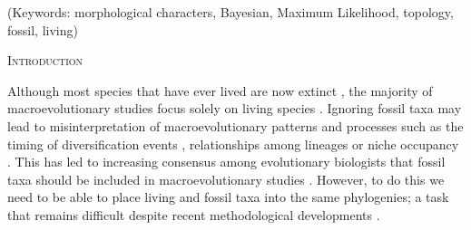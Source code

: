 \documentclass[12pt,letterpaper]{article}
\renewcommand{\section}[1]{%
\bigskip
\begin{center}
\begin{Large}
\normalfont\scshape #1
\medskip
\end{Large}
\end{center}}
\renewcommand{\subsection}[1]{%
\bigskip
\begin{center}
\begin{large}
\normalfont\itshape #1
\end{large}
\end{center}}
\renewcommand{\subsubsection}[1]{%
\vspace{2ex}
\noindent
\textit{#1.}---}
\begin{document}
\begin{abstract}

\end{abstract}

\noindent (Keywords: morphological characters, Bayesian, Maximum Likelihood, topology, fossil, living)\\

\vspace{1.5in}

\newpage 

%
%

\section{Introduction}

Although most species that have ever lived are now extinct \citep{novacek1992ext,raup1993extinction}, the majority of macroevolutionary studies focus solely on living species \citep[e.g.][]{meredithimpacts2011,jetzthe2012}. Ignoring fossil taxa may lead to misinterpretation of macroevolutionary patterns and processes such as the timing of diversification events \citep[e.g.][]{pyrondivergence2011}, relationships among lineages \citep[e.g.][]{manosphylogeny2007} or niche occupancy \citep[e.g.][]{pearmanniche2008}. This has led to increasing consensus among evolutionary biologists that fossil taxa should be included in macroevolutionary studies \citep{jacksonwhat2006,quentaldiversity2010,dietlconservation2011,slaterunifying2013,fritzdiversity2013}. However, to do this we need to be able to place living and fossil taxa into the same phylogenies; a task that remains difficult despite recent methodological developments \citep[e.g.][]{pyrondivergence2011,ronquista2012,BEASTmaster}.
\end{document}
